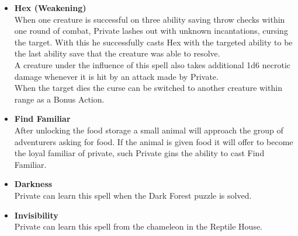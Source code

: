 \begin{itemize}
\begin{itemize}
		\item \textcolor{titlered}{\textbf{Hex (Weakening)}}\\
		When one creature is successful on three ability saving throw checks within one round of combat, Private lashes out with unknown incantations, cursing the target. With this he successfully casts Hex with the targeted ability to be the last ability save that the creature was able to resolve.\\
		A creature under the influence of this spell also takes additional 1d6 necrotic damage whenever it is hit by an attack made by Private.\\
		When the target dies the curse can be switched to another creature within range as a Bonus Action.
		\item \textcolor{titlered}{\textbf{Find Familiar}}\\
		After unlocking the food storage a small animal will approach the group of adventurers asking for food. If the animal is given food it will offer to become the loyal familiar of private, such Private gins the ability to cast Find Familiar.
		\item \textcolor{titlered}{\textbf{Darkness}}\\
		Private can learn this spell when the Dark Forest puzzle is solved.
		\item \textcolor{titlered}{\textbf{Invisibility}}\\
		Private can learn this spell from the chameleon in the Reptile House.
	\end{itemize}
\end{itemize}


